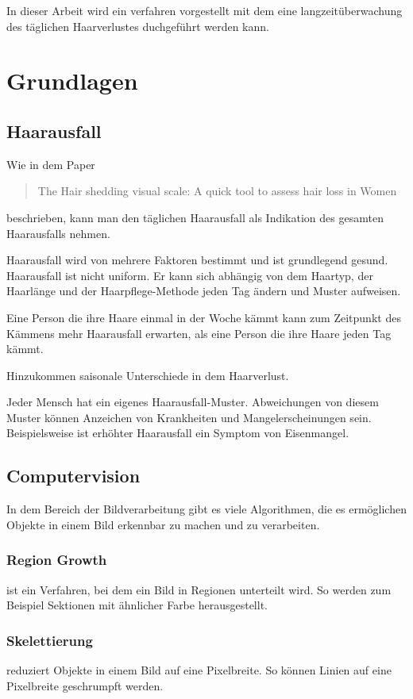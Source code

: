 \documentclass[german,a4paper,12pt]{llncs}
\begin{document}
In dieser Arbeit wird ein verfahren vorgestellt mit dem eine langzeitüberwachung des täglichen Haarverlustes duchgeführt werden kann.

\section{Grundlagen}

\subsection{Haarausfall}
Wie in dem Paper \blockquote{The Hair shedding visual scale: A quick tool to assess hair loss in Women} beschrieben, kann man den täglichen Haarausfall als Indikation des gesamten Haarausfalls nehmen.\cite{visualScale}

Haarausfall wird von mehrere Faktoren bestimmt und ist grundlegend gesund. Haarausfall ist nicht uniform. Er kann sich abhängig von dem Haartyp, der Haarlänge und der Haarpflege-Methode jeden Tag ändern und Muster aufweisen. 

Eine Person die ihre Haare einmal in der Woche kämmt kann zum Zeitpunkt des Kämmens mehr Haarausfall erwarten, als eine Person die ihre Haare jeden Tag kämmt. 

Hinzukommen saisonale Unterschiede in dem Haarverlust.\cite{seasoalShedding}

Jeder Mensch hat ein eigenes Haarausfall-Muster. Abweichungen von diesem Muster können Anzeichen von Krankheiten und Mangelerscheinungen sein. Beispielsweise ist erhöhter Haarausfall ein Symptom von Eisenmangel.\cite{ironDeficiency}

\subsection{Computervision}
In dem Bereich der Bildverarbeitung gibt es viele Algorithmen, die es ermöglichen Objekte in einem Bild erkennbar zu machen und zu verarbeiten.

\subsubsection{Region Growth}
ist ein Verfahren, bei dem ein Bild in Regionen unterteilt wird. So werden zum Beispiel Sektionen mit ähnlicher Farbe herausgestellt. 

\subsubsection{Skelettierung}
reduziert Objekte in einem Bild auf eine Pixelbreite. So können Linien auf eine Pixelbreite geschrumpft werden.
\end{document}

